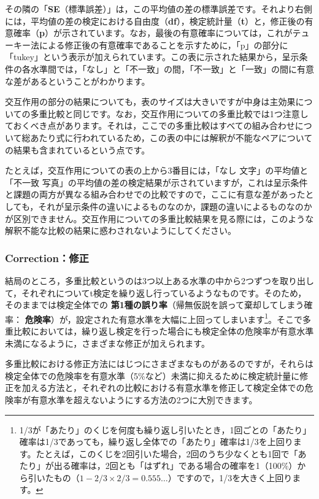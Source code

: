 \documentclass[
  12pt,
  a5jpaper,
  lualatex, ja=standard]{bxjsbook}
\renewcommand{\emph}[1]{\textbf{\color{emph} #1}}
\begin{document}
その隣の「\textbf{SE}（標準誤差）」は，この平均値の差の標準誤差です。それより右側には，平均値の差の検定における自由度（\textbf{df}），検定統計量（\textbf{t}）と，修正後の有意確率（\textbf{p}）が示されています。なお，最後の有意確率については，これがテューキー法による修正後の有意確率であることを示すために，「p」の部分に「tukey」という表示が加えられています。この表に示された結果から，呈示条件の各水準間では，「なし」と「不一致」の間，「不一致」と「一致」の間に有意な差があるということがわかります。

交互作用の部分の結果についても，表のサイズは大きいですが中身は主効果についての多重比較と同じです。なお，交互作用についての多重比較では1つ注意しておくべき点があります。それは，ここでの多重比較はすべての組み合わせについて総あたり式に行われているため，この表の中には解釈が不能なペアについての結果も含まれているという点です。

たとえば，交互作用についての表の上から3番目には，「なし 文字」の平均値と「不一致 写真」の平均値の差の検定結果が示されていますが，これは呈示条件と課題の両方が異なる組み合わせでの比較ですので，ここに有意な差があったとしても，それが呈示条件の違いによるものなのか，課題の違いによるものなのかが区別できません。交互作用についての多重比較結果を見る際には，このような解釈不能な比較の結果に惑わされないようにしてください。

\hypertarget{correctionux4feeux6b63}{%
\subsubsection*{Correction：修正}\label{correctionux4feeux6b63}}

結局のところ，多重比較というのは3つ以上ある水準の中から2つずつを取り出して，それぞれについてt検定を繰り返し行っているようなものです。そのため，そのままでは検定全体での\emph{第1種の誤り率}（帰無仮説を誤って棄却してしまう確率：\emph{危険率}）が，設定された有意水準を大幅に上回ってしまいます\footnote{1/3が「あたり」のくじを何度も繰り返し引いたとき，1回ごとの「あたり」確率は1/3であっても，繰り返し全体での「あたり」確率は1/3を上回ります。たとえば，このくじを2回引いた場合，2回のうち少なくとも1回で「あたり」が出る確率は，2回とも「はずれ」である場合の確率を1（100\%）から引いたもの（\(1-2/3\times2/3=0.555\dots\)）ですので，1/3を大きく上回ります。}。そこで多重比較においては，繰り返し検定を行った場合にも検定全体の危険率が有意水準未満になるように，さまざまな修正が加えられます。

多重比較における修正方法にはじつにさまざまなものがあるのですが，それらは検定全体での危険率を有意水準（5\%など）未満に抑えるために検定統計量に修正を加える方法と，それぞれの比較における有意水準を修正して検定全体での危険率が有意水準を超えないようにする方法の2つに大別できます。
\end{document}
